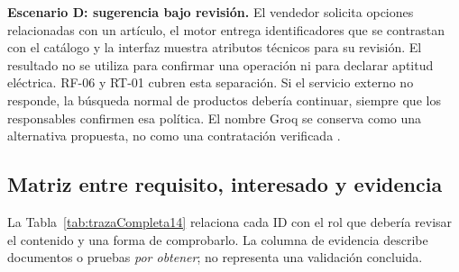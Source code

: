 \textbf{Escenario D: sugerencia bajo revisión.} El vendedor solicita opciones relacionadas con un artículo, el motor entrega identificadores que se contrastan con el catálogo y la interfaz muestra atributos técnicos para su revisión. El resultado no se utiliza para confirmar una operación ni para declarar aptitud eléctrica. RF-06 y RT-01 cubren esta separación. Si el servicio externo no responde, la búsqueda normal de productos debería continuar, siempre que los responsables confirmen esa política. El nombre Groq se conserva como una alternativa propuesta, no como una contratación verificada \cite{basePFC2026}.

\subsection{Matriz entre requisito, interesado y evidencia}
La Tabla~\ref{tab:trazaCompleta14} relaciona cada ID con el rol que debería revisar el contenido y una forma de comprobarlo. La columna de evidencia describe documentos o pruebas \emph{por obtener}; no representa una validación concluida.
